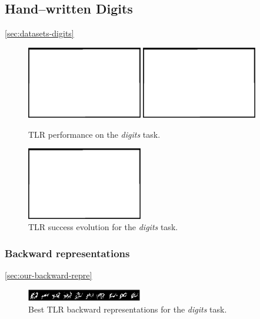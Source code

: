 
\subsection{Hand--written Digits} 
\label{sec:tlr-digits} 

\ref{sec:datasets-digits} 
\begin{figure}[H]
  \centering
  \includegraphics[width=0.45\textwidth]{img/placeholder.png}   
  \includegraphics[width=0.45\textwidth]{img/placeholder.png}    
  \caption{TLR performance on the \emph{digits} task.}
  \label{fig:results-tlr-digits-success}
\end{figure}

\begin{figure}[H]
  \centering
  \includegraphics[width=0.45\textwidth]{img/placeholder.png}    
  \caption{TLR success evolution for the \emph{digits} task.}
  \label{fig:results-tlr-digits-epoch} 
\end{figure}

\subsubsection{Backward representations} 
\ref{sec:our-backward-repre} 
\begin{figure}[H]
  \centering
  \includegraphics[width=0.45\textwidth]{img/digits_tlr.png}    
  \caption{Best TLR backward representations for the \emph{digits} task.}
  \label{fig:results-tlr-digits-backward} 
\end{figure}

